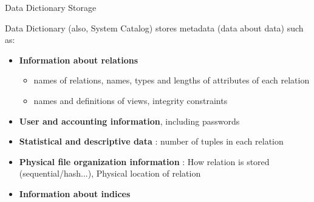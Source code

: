 \documentclass[aspectratio=169, xcolor=dvipsnames]{beamer}
\begin{document}
\begin{frame}{Data Dictionary Storage}
    \begin{block}{}
        Data Dictionary (also, System Catalog) stores metadata (data about data) such as:
        \begin{itemize}
            \item \textbf{Information about relations}
            \begin{itemize}
                \item names of relations, names, types and lengths of attributes of each relation
                \item names and definitions of views, integrity constraints
            \end{itemize}
            \item \textbf{User and accounting information}, including passwords
            \item \textbf{Statistical and descriptive data} : number of tuples in each relation
            \item \textbf{Physical file organization information} : How relation is stored (sequential/hash...), Physical location of relation
            \item \textbf{Information about indices}
        \end{itemize}
    \end{block}
\end{frame}
\end{document}
